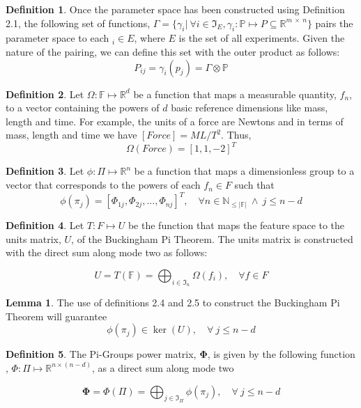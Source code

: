 \documentclass{article}
\theoremstyle{definition}
\newtheorem{definition}{Definition}[section]
\newtheorem{lemma}[theorem]{Lemma}
\begin{document}
\begin{definition}
    Once the parameter space has been constructed using Definition 2.1, the following set of functions, $\Gamma = \{ \gamma_i | \ \forall i \in \mathfrak{I}_{E},  \gamma_i: \mathbb{P} \mapsto P \subseteq \mathbb{R}^{m \  \times \ n} \}$  pairs the parameter space to each $_i \in E$, where $E$ is the set of all experiments. Given the nature of the pairing, we can define this set with the outer product as follows: 
        $$ P_{ij} =   \gamma_i (p_j) = \Gamma \otimes \mathbb{P} $$
\end{definition} %

\begin{definition} Let $\Omega: \mathbb{F} \mapsto \mathbb{R}^{d} $ be a function that maps a measurable quantity, $f_n$, to a vector containing the powers of $d$ basic reference dimensions like mass, length and time.  For example, the units of a force are Newtons and in terms of mass, length and time we have $[Force]  = ML/T^{2}$. Thus, $$\Omega(Force) = [1, 1, - 2]^{T}$$ 

\end{definition}

\begin{definition}
    Let $\phi: \Pi \mapsto \mathbb{R}^{n}$ be a function that maps a dimensionless group to a vector that corresponds to the powers of each $f_n\in F$ such that 
    $$\phi(\pi_{j}) = [\Phi_{1j} , \Phi_{2j} , . . . , \Phi_{nj} ]^{T}, \quad \forall n \in \mathbb{N}_{\leq |\mathbb{F}|} \  \land \ j \leq n - d  $$
\end{definition} %

\begin{definition}
    Let $T : F \mapsto U$ be the function that maps the feature space to the units matrix, $U$, of the Buckingham Pi Theorem. The units matrix is constructed with the direct sum along mode two as follows:

      $$ U =  T (\mathbb{F}) = \bigoplus_{i \in \mathfrak{I}_n} \Omega(f_i), \quad \forall f \in F$$
\end{definition}

\begin{lemma}
    The use of definitions 2.4 and 2.5 to construct the Buckingham Pi Theorem will guarantee $$\phi(\pi_j) \in \ker(U), \quad \forall \ j \leq n - d$$ 
\end{lemma}

\begin{definition}
    The Pi-Groups power matrix, $\boldsymbol{\Phi}$, is given by the following function , $\Phi: \Pi \mapsto \mathbb{R}^{n \times (n - d)}$, as a direct sum along mode two 


    $$ \boldsymbol{\Phi} =  \Phi(\Pi) = \bigoplus_{j \in \mathfrak{I}_\Pi} \phi(\pi_j), \quad \forall \ j \leq n - d$$
\end{definition}
\end{document}
